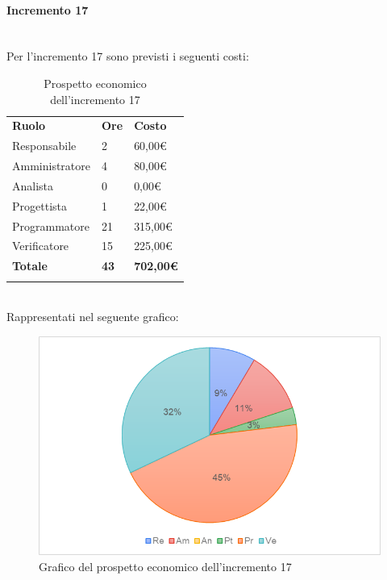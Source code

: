 \paragraph{Incremento 17} \mbox{} \\
Per l'incremento 17 sono previsti i seguenti costi:
\begin{longtable} {
		>{}p{32mm}
		>{}p{20mm}
		>{}p{20mm}
	}
	\rowcolor{gray!50}
	
	\textbf{Ruolo} & \textbf{Ore} & \textbf{Costo} \TBstrut \\
	Responsabile & 2 & 60,00\euro{} \TBstrut \\
	Amministratore & 4 & 80,00\euro{} \TBstrut \\
	Analista & 0 & 0,00\euro{} \TBstrut \\
	Progettista & 1 & 22,00\euro{}\TBstrut \\
	Programmatore & 21 & 315,00\euro{} \TBstrut \\
	Verificatore & 15 & 225,00\euro{} \TBstrut \\
	\textbf{Totale} & \textbf{43}& \textbf{702,00\euro{}} \TBstrut \\	
	\rowcolor{white}
	\caption{Prospetto economico dell'incremento 17}
\end{longtable} \mbox{} \\
Rappresentati nel seguente grafico: \mbox{}
\begin{figure} [H]
	\includegraphics[width=\linewidth]{./img/Grafici/ra5.png}
	\caption{Grafico del prospetto economico dell'incremento 17}
\end{figure}

